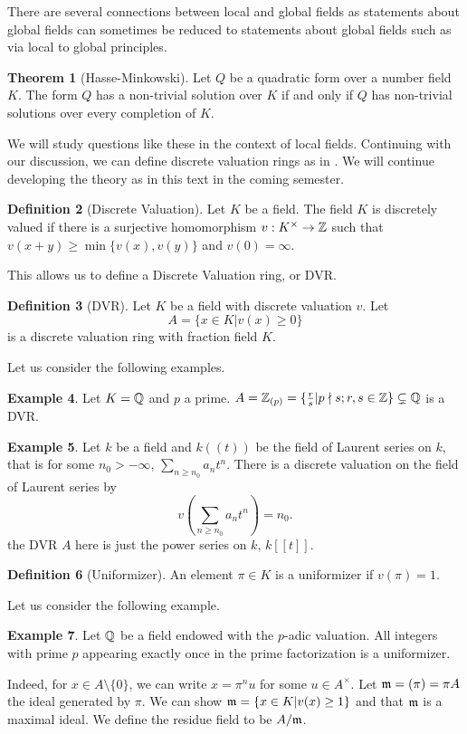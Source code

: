 \documentclass{amsart}
\theoremstyle{definition}
\newtheorem{theorem}{Theorem}[section]
\newtheorem{example}[theorem]{Example}
\newtheorem{definition}[theorem]{Definition}
\numberwithin{equation}{section}
\begin{document}
There are several connections between local and global fields as statements about global fields can sometimes be reduced to statements about global fields such as via local to global principles. 
\begin{theorem}[Hasse-Minkowski]
  Let $Q$ be a quadratic form over a number field $K$. The form $Q$ has a non-trivial solution over $K$ if and only if $Q$ has non-trivial solutions over every completion of $K$. 
\end{theorem}
We will study questions like these in the context of local fields. Continuing with our discussion, we can define discrete valuation rings as in \cite[\S 1]{Serre}. We will continue developing the theory as in this text in the coming semester. 
\begin{definition}[Discrete Valuation]
  Let $K$ be a field. The field $K$ is discretely valued if there is a surjective homomorphism $v:K^{\times}\to\mathbb{Z}$ such that $v(x+y)\geq\min\{v(x),v(y)\}$ and $v(0)=\infty$. 
\end{definition}
This allows us to define a Discrete Valuation ring, or DVR. 
\begin{definition}[DVR]
  Let $K$ be a field with discrete valuation $v$. Let 
  $$A=\{x\in K|v(x)\geq0\}$$
  is a discrete valuation ring with fraction field $K$. 
\end{definition}
Let us consider the following examples. 
\begin{example}
  Let $K=\mathbb{Q}$ and $p$ a prime. $A=\mathbb{Z}_{(p)}=\{\frac{r}{s}|p\nmid s; r,s\in\mathbb{Z}\}\subsetneq\mathbb{Q}$ is a DVR. 
\end{example}
\begin{example}
  Let $k$ be a field and $k((t))$ be the field of Laurent series on $k$, that is for some $n_{0}>-\infty$, $\sum_{n\geq n_{0}}a_{n}t^{n}$. There is a discrete valuation on the field of Laurent series by
  $$v\left(\sum_{n\geq n_{0}}a_{n}t^{n}\right)=n_{0}.$$
  the DVR $A$ here is just the power series on $k$, $k[[t]]$.
\end{example}
\begin{definition}[Uniformizer]
  An element $\pi\in K$ is a uniformizer if $v(\pi)=1$. 
\end{definition}
Let us consider the following example.
\begin{example}
  Let $\mathbb{Q}$ be a field endowed with the $p$-adic valuation. All integers with prime $p$ appearing exactly once in the prime factorization is a uniformizer. 
\end{example}
Indeed, for $x\in A\setminus\{0\}$, we can write $x=\pi^{n}u$ for some $u\in A^{\times}$. Let $\mathfrak{m}=(\pi)=\pi A$ the ideal generated by $\pi$. We can show $\mathfrak{m}=\{x\in K|v(x)\geq1\}$ and that $\mathfrak{m}$ is a maximal ideal. We define the residue field to be $A/\mathfrak{m}$. 
\newpage
\printbibliography
\end{document}
